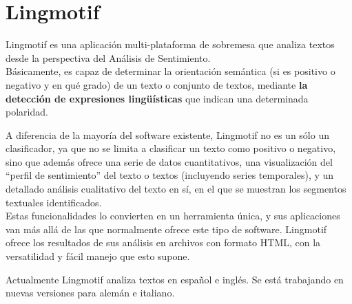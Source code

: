 
\section{Lingmotif~\cite{lingmotif}}
Lingmotif es una aplicación multi-plataforma de sobremesa que analiza textos desde la perspectiva 
del Análisis de Sentimiento. \\Básicamente, es capaz de determinar la orientación semántica 
(si es positivo o negativo y en qué grado) de un texto o conjunto de textos, mediante \textbf{la detección 
de expresiones lingüísticas} que indican una determinada polaridad.

A diferencia de la mayoría del software existente, Lingmotif no es un sólo un clasificador, 
ya que no se limita a clasificar un texto como positivo o negativo, sino que además ofrece una 
serie de datos cuantitativos, una visualización del ``perfil de sentimiento'' del texto o textos 
(incluyendo series temporales), y un detallado análisis cualitativo del texto en sí, en el que 
se muestran los segmentos textuales identificados. \\Estas funcionalidades lo convierten en un herramienta 
única, y sus aplicaciones van más allá de las que normalmente ofrece este tipo de software. 
Lingmotif ofrece los resultados de sus análisis en archivos con formato HTML, con la versatilidad y 
fácil manejo que esto supone.

Actualmente Lingmotif analiza textos en español e inglés. Se está trabajando en nuevas versiones 
para alemán e italiano.


